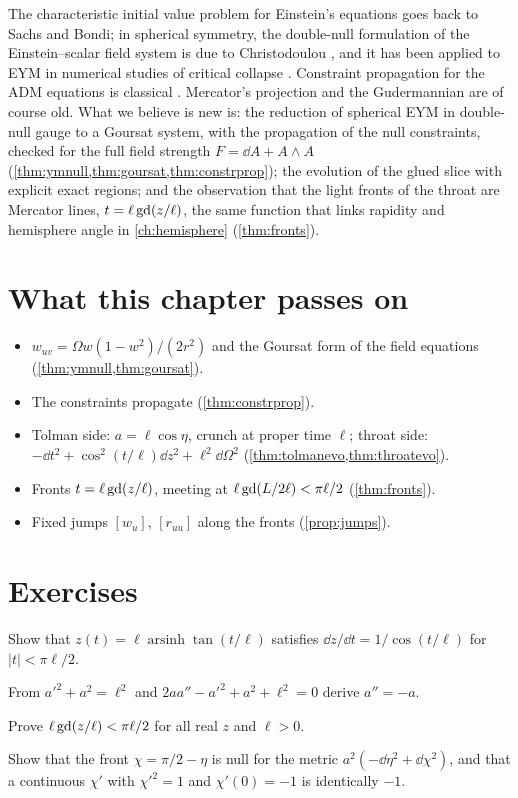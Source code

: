 \begin{litbox}
The characteristic initial value problem for Einstein's equations goes back to Sachs and Bondi; in spherical symmetry, the double-null formulation of the Einstein--scalar field system is due to Christodoulou \cite{Christodoulou1993}, and it has been applied to EYM in numerical studies of critical collapse \cite{ChoptuikChmajBizon1996}. Constraint propagation for the ADM equations is classical \cite{Frittelli1997}. Mercator's projection and the Gudermannian are of course old. What we believe is new is: the reduction of spherical EYM in double-null gauge to a Goursat system, with the propagation of the null constraints, checked for the full field strength $F=\dd A+A\wedge A$ (\cref{thm:ymnull,thm:goursat,thm:constrprop}); the evolution of the glued slice with explicit exact regions; and the observation that the light fronts of the throat are Mercator lines, $t=\ell\operatorname{gd}(z/\ell)$, the same function that links rapidity and hemisphere angle in \cref{ch:hemisphere} (\cref{thm:fronts}).
\end{litbox}

\section*{What this chapter passes on}
\begin{itemize}[nosep]
\item $w_{uv}=\Omega w(1-w^2)/(2r^2)$ and the Goursat form of the field equations (\cref{thm:ymnull,thm:goursat}).
\item The constraints propagate (\cref{thm:constrprop}).
\item Tolman side: $a=\ell\cos\eta$, crunch at proper time $\ell$; throat side: $-\dd t^2+\cos^2(t/\ell)\dd z^2+\ell^2\dd\Omega^2$ (\cref{thm:tolmanevo,thm:throatevo}).
\item Fronts $t=\ell\operatorname{gd}(z/\ell)$, meeting at $\ell\operatorname{gd}(L/2\ell)<\pi\ell/2$ (\cref{thm:fronts}).
\item Fixed jumps $[w_u]$, $[r_{uu}]$ along the fronts (\cref{prop:jumps}).
\end{itemize}

\section*{Exercises}
\begin{exercise}
Show that $z(t)=\ell\operatorname{arsinh}\tan(t/\ell)$ satisfies $\dd z/\dd t=1/\cos(t/\ell)$ for $|t|<\pi\ell/2$.
\end{exercise}
\begin{exercise}
From $a'^2+a^2=\ell^2$ and $2aa''-a'^2+a^2+\ell^2=0$ derive $a''=-a$.
\end{exercise}
\begin{exercise}
Prove $\ell\operatorname{gd}(z/\ell)<\pi\ell/2$ for all real $z$ and $\ell>0$.
\end{exercise}
\begin{exercise}
Show that the front $\chi=\pi/2-\eta$ is null for the metric $a^2(-\dd\eta^2+\dd\chi^2)$, and that a continuous $\chi'$ with $\chi'^2=1$ and $\chi'(0)=-1$ is identically $-1$.
\end{exercise}

